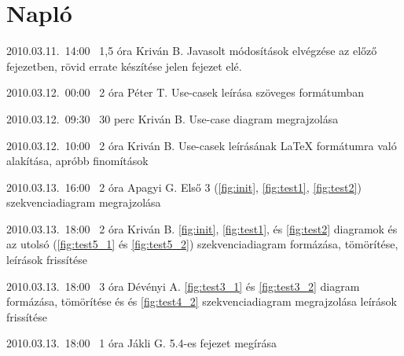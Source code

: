 %
\section{Napló}

\begin{naplo}

\bejegyzes
{2010.03.11.~14:00~}
{1,5 óra}
{Kriván B.}
{Javasolt módosítások elvégzése az előző fejezetben, rövid errate készítése jelen fejezet elé.}

\bejegyzes
{2010.03.12.~00:00~}
{2 óra}
{Péter T.}
{Use-casek leírása szöveges formátumban}

\bejegyzes
{2010.03.12.~09:30~}
{30 perc}
{Kriván B.}
{Use-case diagram megrajzolása}

\bejegyzes
{2010.03.12.~10:00~}
{2 óra}
{Kriván B.}
{Use-casek leírásának \LaTeX{} formátumra való alakítása, apróbb finomítások}

\bejegyzes
{2010.03.13.~16:00~}
{2 óra}
{Apagyi G.}
{Első 3 (\ref{fig:init}, \ref{fig:test1}, \ref{fig:test2}) szekvenciadiagram megrajzolása}

\bejegyzes
{2010.03.13.~18:00~}
{2 óra}
{Kriván B.}
{\ref{fig:init}, \ref{fig:test1}, és \ref{fig:test2} diagramok és az utolsó (\ref{fig:test5_1} és \ref{fig:test5_2}) szekvenciadiagram formázása, tömörítése, leírások frissítése}

\bejegyzes
{2010.03.13.~18:00~}
{3 óra}
{Dévényi A.}
{\ref{fig:test3_1} és \ref{fig:test3_2} diagram formázása, tömörítése és  és \ref{fig:test4_2} szekvenciadiagram megrajzolása leírások frissítése}

\bejegyzes
{2010.03.13.~18:00~}
{1 óra}
{Jákli G.}
{5.4-es fejezet megírása}

\end{naplo}

